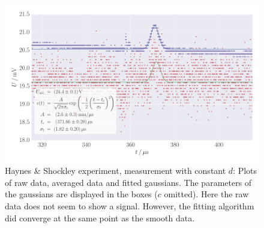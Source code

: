 \begin{figure}
    \centering
    \includegraphics[width=1.0\textwidth]{figures/haynes_shockley_raw_U_59}
    \caption{
        Haynes \& Shockley experiment, measurement with constant $d$:
        Plots of raw data, averaged data and fitted gaussians. 
        The parameters of the gaussians are displayed in the boxes 
        ($c$ omitted). Here the raw data does not seem to show a signal. 
        However, the fitting algorithm did converge at the same point as 
        the smooth data. 
        }
    \label{fig:h_s_raw_U_59}
\end{figure}

